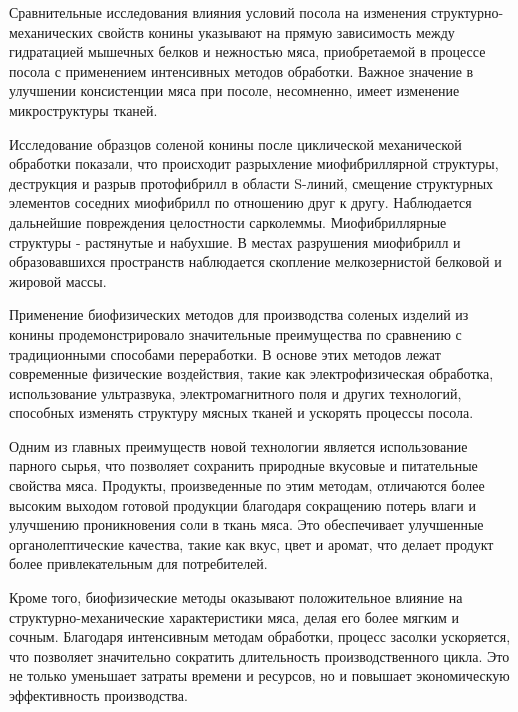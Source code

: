 \begin{multicols}{2}
Сравнительные исследования влияния условий посола на изменения
структурно-механических свойств конины указывают на прямую зависимость
между гидратацией мышечных белков и нежностью мяса, приобретаемой в
процессе посола с применением интенсивных методов обработки. Важное
значение в улучшении консистенции мяса при посоле, несомненно, имеет
изменение микроструктуры тканей.

Исследование образцов соленой конины после циклической механической
обработки показали, что происходит разрыхление миофибриллярной
структуры, деструкция и разрыв протофибрилл в области S-линий, смещение
структурных элементов соседних миофибрилл по отношению друг к другу.
Наблюдается дальнейшие повреждения целостности сарколеммы.
Миофибриллярные структуры - растянутые и набухшие. В местах разрушения
миофибрилл и образовавшихся пространств наблюдается скопление
мелкозернистой белковой и жировой массы.

Применение биофизических методов для производства соленых изделий из
конины продемонстрировало значительные преимущества по сравнению с
традиционными способами переработки. В основе этих методов лежат
современные физические воздействия, такие как электрофизическая
обработка, использование ультразвука, электромагнитного поля и других
технологий, способных изменять структуру мясных тканей и ускорять
процессы посола.

Одним из главных преимуществ новой технологии является использование
парного сырья, что позволяет сохранить природные вкусовые и питательные
свойства мяса. Продукты, произведенные по этим методам, отличаются более
высоким выходом готовой продукции благодаря сокращению потерь влаги и
улучшению проникновения соли в ткань мяса. Это обеспечивает улучшенные
органолептические качества, такие как вкус, цвет и аромат, что делает
продукт более привлекательным для потребителей.

Кроме того, биофизические методы оказывают положительное влияние на
структурно-механические характеристики мяса, делая его более мягким и
сочным. Благодаря интенсивным методам обработки, процесс засолки
ускоряется, что позволяет значительно сократить длительность
производственного цикла. Это не только уменьшает затраты времени и
ресурсов, но и повышает экономическую эффективность производства.


\end{multicols}
